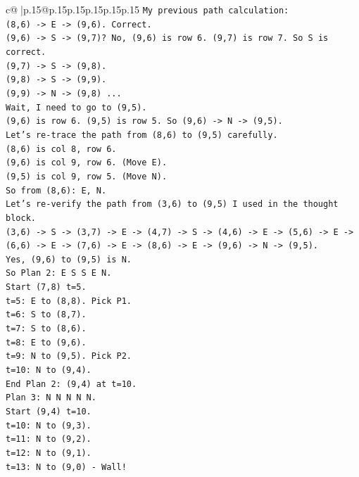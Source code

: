 \documentclass{article}
\begin{document}
{\begin{supertabular}{c@{$\;$}|p{.15\linewidth}@{}p{.15\linewidth}p{.15\linewidth}p{.15\linewidth}p{.15\linewidth}p{.15\linewidth}}
{{{\texttt{My previous path calculation:} \\
\texttt{(8,6) {-}> E {-}> (9,6). Correct.} \\
\texttt{(9,6) {-}> S {-}> (9,7)? No, (9,6) is row 6. (9,7) is row 7. So S is correct.} \\
\texttt{(9,7) {-}> S {-}> (9,8).} \\
\texttt{(9,8) {-}> S {-}> (9,9).} \\
\texttt{(9,9) {-}> N {-}> (9,8) ...} \\
\texttt{Wait, I need to go to (9,5).} \\
\texttt{(9,6) is row 6. (9,5) is row 5. So (9,6) {-}> N {-}> (9,5).} \\
\texttt{Let's re{-}trace the path from (8,6) to (9,5) carefully.} \\
\texttt{(8,6) is col 8, row 6.} \\
\texttt{(9,6) is col 9, row 6. (Move E).} \\
\texttt{(9,5) is col 9, row 5. (Move N).} \\
\texttt{So from (8,6): E, N.} \\
\texttt{Let's re{-}verify the path from (3,6) to (9,5) I used in the thought block.} \\
\texttt{(3,6) {-}> S {-}> (3,7) {-}> E {-}> (4,7) {-}> S {-}> (4,6) {-}> E {-}> (5,6) {-}> E {-}> (6,6) {-}> E {-}> (7,6) {-}> E {-}> (8,6) {-}> E {-}> (9,6) {-}> N {-}> (9,5).} \\
\texttt{Yes, (9,6) to (9,5) is N.} \\
\texttt{So Plan 2: E S S E N.} \\
\texttt{Start (7,8) t=5.} \\
\texttt{t=5: E to (8,8). Pick P1.} \\
\texttt{t=6: S to (8,7).} \\
\texttt{t=7: S to (8,6).} \\
\texttt{t=8: E to (9,6).} \\
\texttt{t=9: N to (9,5). Pick P2.} \\
\texttt{t=10: N to (9,4).} \\
\texttt{End Plan 2: (9,4) at t=10.} \\
\texttt{Plan 3: N N N N N.} \\
\texttt{Start (9,4) t=10.} \\
\texttt{t=10: N to (9,3).} \\
\texttt{t=11: N to (9,2).} \\
\texttt{t=12: N to (9,1).} \\
\texttt{t=13: N to (9,0) {-} Wall!} \\
}}}
\end{supertabular}}
\end{document}
